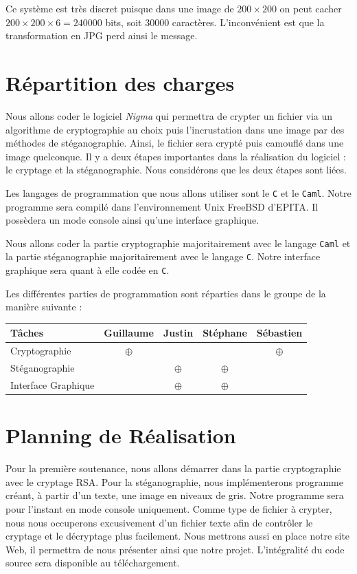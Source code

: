\documentclass[a4paper,12pt]{article}
\begin{document}
Ce système est très discret puisque dans une image de $200 \times 200$ on peut cacher $200 \times 200 \times 6 = 240000$ bits, soit 30000 caractères. L'inconvénient est que la transformation en JPG perd ainsi le message.

\newpage


\part{Répartition des charges}
Nous allons coder le logiciel \emph{Nigma} qui permettra de crypter un fichier via un algorithme de cryptographie au choix puis l'incrustation dans une image par des méthodes de stéganographie. Ainsi, le fichier sera crypté puis camouflé dans une image quelconque. Il y a deux étapes importantes dans la réalisation du logiciel : le cryptage et la stéganographie. Nous considérons que les deux étapes sont liées.

Les langages de programmation que nous allons utiliser sont le \texttt{C} et le \texttt{Caml}. Notre programme sera compilé dans l'environnement Unix FreeBSD d'EPITA. Il possèdera un mode console ainsi qu'une interface graphique.

Nous allons coder la partie cryptographie majoritairement avec le langage \texttt{Caml} et la partie stéganographie majoritairement avec le langage \texttt{C}. Notre interface graphique sera quant à elle codée en \texttt{C}.

Les différentes parties de programmation sont réparties dans le groupe de la manière suivante :

\bigskip

\begin{tabular}{|l|c|c|c|c|}
  \hline
  Tâches              & Guillaume & Justin   & Stéphane & Sébastien \\ \hline \hline
  Cryptographie       & $\oplus$  &          &          & $\oplus$  \\ \hline
  Stéganographie      &           & $\oplus$ & $\oplus$ &           \\ \hline
  Interface Graphique &           & $\oplus$ & $\oplus$ &           \\ \hline
\end{tabular}


\newpage

\part{Planning de Réalisation}
Pour la première soutenance, nous allons démarrer dans la partie cryptographie avec le cryptage RSA. Pour la stéganographie, nous implémenterons programme créant, à partir d'un texte, une image en niveaux de gris. Notre programme sera pour l'instant en mode console uniquement. Comme type de fichier à crypter, nous nous occuperons excusivement d'un fichier texte afin de contrôler le cryptage et le décryptage plus facilement. Nous mettrons aussi en place notre site Web, il permettra de nous présenter ainsi que notre projet. L'intégralité du code source sera disponible au téléchargement.
\end{document}
